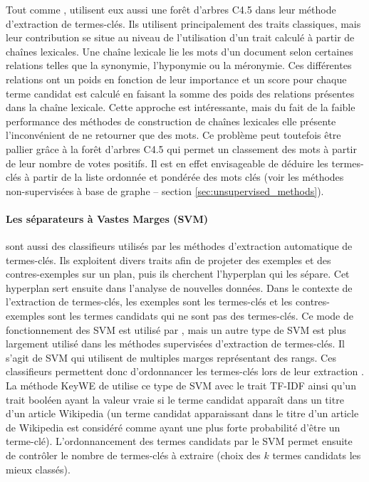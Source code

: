          Tout comme \citet{turney1999learningalgorithms},
        \citet{ercan2007lexicalchains} utilisent eux aussi une forêt d'arbres C4.5
        dans leur méthode d'extraction de termes-clés. Ils utilisent
        principalement des traits classiques, mais leur contribution se situe au
        niveau de l'utilisation d'un trait calculé à partir de chaînes lexicales.
        Une chaîne lexicale lie les mots d'un document selon certaines relations
        telles que la synonymie, l'hyponymie ou la méronymie. Ces différentes
        relations ont un poids en fonction de leur importance et un score pour
        chaque terme candidat est calculé en faisant la somme des poids des
        relations présentes dans la chaîne lexicale. Cette approche est
        intéressante, mais du fait de la faible performance des méthodes de
        construction de chaînes lexicales elle présente l'inconvénient de ne
        retourner que des mots. Ce problème peut toutefois être
        pallier grâce à la forêt d'arbres C4.5 qui permet un classement des mots à
        partir de leur nombre de votes positifs. Il est en effet envisageable de
        déduire les termes-clés à partir de la liste ordonnée et pondérée des mots
        clés (voir les méthodes non-supervisées à base de graphe -- section
        \ref{sec:unsupervised_methods}).

      \paragraph{Les séparateurs à Vastes Marges (SVM)}
        sont aussi des classifieurs utilisés par les méthodes d'extraction
        automatique de termes-clés. Ils exploitent divers traits afin de projeter
        des exemples et des contres-exemples sur un plan, puis ils cherchent
        l'hyperplan qui les sépare. Cet hyperplan sert ensuite dans l'analyse de
        nouvelles données. Dans le contexte de l'extraction de termes-clés, les
        exemples sont les termes-clés et les contres-exemples sont les termes
        candidats qui ne sont pas des termes-clés. Ce mode de fonctionnement des
        SVM est utilisé par \citet{zhang2006svm}, mais un autre type de SVM est
        plus largement utilisé dans les méthodes supervisées d'extraction de
        termes-clés. Il s'agit de SVM qui utilisent de multiples marges
        représentant des rangs. Ces classifieurs permettent donc d'ordonnancer les
        termes-clés lors de leur extraction \citep{herbrich1999svm,
        joachims2006linearsvm, jiang2009rankingsvm}. La méthode KeyWE de
        \citet{eichler2010keywe} utilise ce type de SVM avec le trait TF-IDF ainsi
        qu'un trait booléen ayant la valeur vraie si le terme candidat apparaît
        dans un titre d'un article Wikipedia (un terme candidat apparaissant dans
        le titre d'un article de Wikipedia est considéré comme ayant une plus
        forte probabilité d'être un terme-clé). L'ordonnancement des termes
        candidats par le SVM permet ensuite de contrôler le nombre de termes-clés
        à extraire (choix des $k$ termes candidats les mieux classés).

